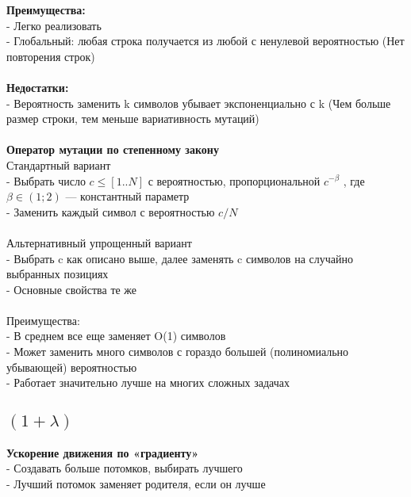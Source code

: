 \textbf{Преимущества: \\}
 - Легко реализовать \\
 - Глобальный: любая строка получается из любой с ненулевой вероятностью (Нет повторения строк) \\
\\
\textbf{Недостатки: \\}
 - Вероятность заменить k символов убывает экспоненциально с k (Чем больше размер строки, тем меньше вариативность мутаций)\\
\\
\textbf{Оператор мутации по степенному закону \\}
Стандартный вариант \\
- Выбрать число $c \le [1..N]$ с вероятностью, пропорциональной $c ^ {- \beta}$ , где $\beta \in (1;2)$ — константный параметр \\
- Заменить каждый символ с вероятностью $c/N$\\ 
\\
Альтернативный  упрощенный  вариант \\
- Выбрать c как описано выше, далее заменять c символов на случайно выбранных позициях \\
- Основные свойства те же \\
\\
Преимущества: \\
- В среднем все еще заменяет O(1) символов\\
- Может заменить много символов с гораздо большей (полиномиально убывающей) вероятностью \\
- Работает значительно лучше на многих сложных задачах

\subsection*{$(1+\lambda)$}

\textbf{Ускорение движения по «градиенту»} \\
- Создавать больше потомков, выбирать лучшего \\
- Лучший потомок заменяет родителя, если он лучше

